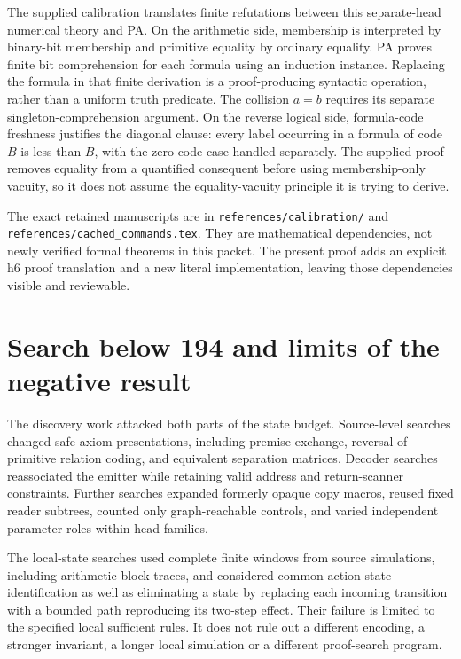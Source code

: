 \documentclass[11pt,letterpaper]{article}
\newcommand{\file}[1]{\texttt{\nolinkurl{#1}}}
\begin{document}
The supplied calibration translates finite refutations between this
separate-head numerical theory and PA. On the arithmetic side, membership
is interpreted by binary-bit membership and primitive equality by ordinary
equality. PA proves finite bit comprehension for each formula using an
induction instance. Replacing the formula in that finite derivation is a
proof-producing syntactic operation, rather than a uniform truth predicate.
The collision $a=b$ requires its separate singleton-comprehension argument.
On the reverse logical side, formula-code freshness justifies the diagonal
clause: every label occurring in a formula of code $B$ is less than $B$,
with the zero-code case handled separately. The supplied proof removes
equality from a quantified consequent before using membership-only vacuity,
so it does not assume the equality-vacuity principle it is trying to derive.

The exact retained manuscripts are in \file{references/calibration/} and
\file{references/cached_commands.tex}. They are mathematical dependencies,
not newly verified formal theorems in this packet. The present proof adds
an explicit h6 proof translation and a new literal implementation, leaving
those dependencies visible and reviewable.



\section{Search below 194 and limits of the negative result}

The discovery work attacked both parts of the state budget. Source-level
searches changed safe axiom presentations, including premise exchange,
reversal of primitive relation coding, and equivalent separation matrices.
Decoder searches reassociated the emitter while retaining valid address
and return-scanner constraints. Further searches expanded formerly opaque
copy macros, reused fixed reader subtrees, counted only graph-reachable
controls, and varied independent parameter roles within head families.

The local-state searches used complete finite windows from source
simulations, including arithmetic-block traces, and considered common-action
state identification as well as eliminating a state by replacing each
incoming transition with a bounded path reproducing its two-step effect.
Their failure is limited to the specified local sufficient rules. It does
not rule out a different encoding, a stronger invariant, a longer local
simulation or a different proof-search program.
\end{document}

